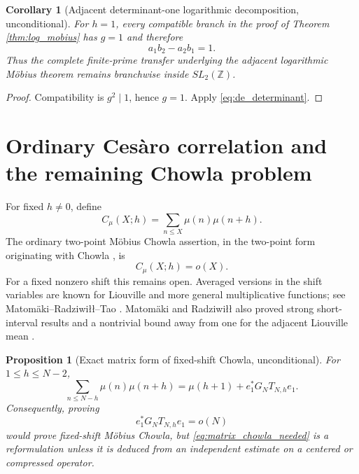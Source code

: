 \documentclass[11pt]{amsart}
\numberwithin{equation}{section}
\theoremstyle{plain}
\newtheorem{proposition}[theorem]{Proposition}
\newtheorem{corollary}[theorem]{Corollary}
\theoremstyle{definition}
\theoremstyle{remark}
\newcommand{\Z}{\mathbb Z}
\newcommand{\mob}{\mu}
\begin{document}
\begin{corollary}[Adjacent determinant-one logarithmic decomposition, unconditional]
\label{cor:adjacent_SL2_log}
For $h=1$, every compatible branch in the proof of Theorem \ref{thm:log_mobius} has $g=1$ and therefore
\begin{equation}
a_1b_2-a_2b_1=1.
\label{eq:adjacent_branch_SL2}
\end{equation}
Thus the complete finite-prime transfer underlying the adjacent logarithmic Möbius theorem remains branchwise inside $SL_2(\Z)$.
\end{corollary}

\begin{proof}
Compatibility is $g^2\mid1$, hence $g=1$.  Apply \eqref{eq:de_determinant}.
\end{proof}

\section{Ordinary Cesàro correlation and the remaining Chowla problem}
\label{sec:cesaro_chowla}

For fixed $h\ne0$, define
\begin{equation}
C_\mob(X;h)=\sum_{n\le X}\mob(n)\mob(n+h).
\label{eq:mu_cesaro_correlation}
\end{equation}
The ordinary two-point Möbius Chowla assertion, in the two-point form originating with Chowla \cite{Chowla1965}, is
\begin{equation}
C_\mob(X;h)=o(X).
\label{eq:mu_chowla_target}
\end{equation}
For a fixed nonzero shift this remains open.  Averaged versions in the shift variables are known for Liouville and more general multiplicative functions; see Matomäki--Radziwiłł--Tao \cite{MRT2015}.  Matomäki and Radziwiłł also proved strong short-interval results and a nontrivial bound away from one for the adjacent Liouville mean \cite{MatomakiRadziwill2016}.

\begin{proposition}[Exact matrix form of fixed-shift Chowla, unconditional]
\label{prop:matrix_chowla}
For $1\le h\le N-2$,
\begin{equation}
\sum_{n\le N-h}\mob(n)\mob(n+h)
=\mob(h+1)+e_1^*G_NT_{N,h}e_1.
\label{eq:matrix_chowla_exact}
\end{equation}
Consequently, proving
\begin{equation}
e_1^*G_NT_{N,h}e_1=o(N)
\label{eq:matrix_chowla_needed}
\end{equation}
would prove fixed-shift Möbius Chowla, but \eqref{eq:matrix_chowla_needed} is a reformulation unless it is deduced from an independent estimate on a centered or compressed operator.
\end{proposition}
\end{document}

